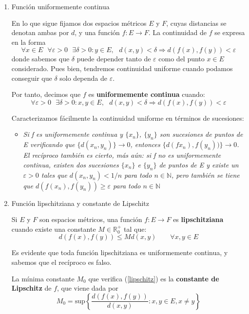 \documentclass[a4paper, 12pt]{article}
\begin{document}
\begin{enumerate}[label=\textbf{\arabic*}.]
\begin{enumerate}[label=\textit{\alph*})]
		
	\medskip
	
	\item Función uniformemente continua
	
	En lo que sigue fijamos dos espacios métricos \(E\) y \(F\), cuyas distancias se denotan ambas por \(d\), y una función \(f: E \rightarrow F\). La continuidad de \(f\) se expresa en la forma
	\[
		\forall x \in E \text{ } \forall \varepsilon > 0 \text{ } \exists \delta > 0 : y \in E, \text{ }d(x,y) < \delta \Rightarrow d(f(x),f(y)) < \varepsilon
	\]
	donde sabemos que \(\delta\) puede depender tanto de \(\varepsilon\) como del punto \(x \in E\) considerado. Pues bien, tendremos continuidad uniforme cuando podamos conseguir que \(\delta\) solo dependa de \(\varepsilon\).
	
	Por tanto, decimos que \(f\) es \textbf{uniformemente continua} cuando:
	\[
		\forall \varepsilon > 0 \text{ } \exists \delta > 0 : x,y \in E, \text{ } d(x,y) < \delta \Rightarrow d(f(x),f(y)) < \varepsilon
	\]
	
	Caracterizamos fácilmente la continuidad uniforme en términos de sucesiones:
	\begin{itemize}
		\item \textit{Si f es uniformemente continua y \(\{x_n\}\), \(\{y_n\}\) son sucesiones de puntos de E verificando que \(\{d(x_n, y_n)\} \rightarrow 0\), entonces \(\{d(fx_n),f(y_n))\} \rightarrow 0\). El recíproco también es cierto, más aún: si f no es uniformemente continua, existen dos sucesiones \(\{x_n\}\) e \(\{y_n\}\) de puntos de E y existe un \(\varepsilon > 0\) tales que \(d(x_n,y_n) < 1/n\) para todo \(n \in \mathbb{N}\), pero también se tiene que \(d(f(x_n),f(y_n)) \geq \varepsilon\) para todo \(n \in \mathbb{N}\)}
	\end{itemize}
	
\medskip

	\item Función lipschitziana y constante de Lipschitz
	
	Si \(E\) y \(F\) son espacios métricos, una función \(f:E \rightarrow F\) es \textbf{lipschitziana} cuando existe una constante \(M \in \mathbb{R}_0^+\) tal que:
	\begin{equation}\label{lipschitz}
	d(f(x),f(y)) \leq M d(x,y) \qquad \forall x,y \in E
	\end{equation}
	
	Es evidente que toda función lipschitziana es uniformemente continua, y sabemos que el recíproco es falso.
	
	La mínima constante \(M_0\) que verifica (\ref{lipschitz}) es la \textbf{constante de Lipschitz} de \(f\), que viene dada por
	\[
		M_0 = \text{sup} \left\{ \frac{d(f(x),f(y))}{d(x,y)} : x,y \in E, x \neq y \right\}
	\]
	

\end{enumerate}
\end{enumerate}
\end{document}
